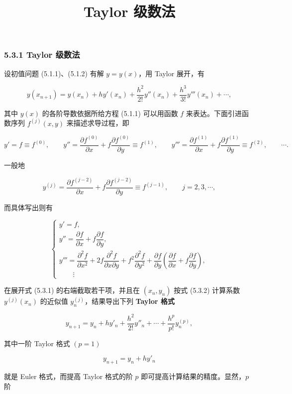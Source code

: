 \documentclass[
  10pt,
  fontset=fandol]{ctexart}
\title{Taylor 级数法}
\author{}
\date{}
\begin{document}
\maketitle

\subsubsection{5.3.1 Taylor 级数法}\label{taylor-ux7ea7ux6570ux6cd5}

设初值问题 (5.1.1)、(5.1.2) 有解 \(y=y(x)\)，用 Taylor 展开，有

\[
y(x_{n+1})=y(x_n)+hy'(x_n)+\frac{h^2}{2!}y''(x_n)+\frac{h^3}{3!}y'''(x_n)+\cdots,\tag{5.3.1}
\]

其中 \(y(x)\) 的各阶导数依据所给方程 (5.1.1) 可以用函数 \(f\) 来表达。下面引进函数序列 \(f^{(j)}(x,y)\) 来描述求导过程，即

\[
y'=f\equiv f^{(0)},\qquad
y''=\frac{\partial f^{(0)}}{\partial x}+f\frac{\partial f^{(0)}}{\partial y}\equiv f^{(1)},\qquad
y'''=\frac{\partial f^{(1)}}{\partial x}+f\frac{\partial f^{(1)}}{\partial y}\equiv f^{(2)},\qquad\cdots.
\]

一般地

\[
y^{(j)}=\frac{\partial f^{(j-2)}}{\partial x}+f\frac{\partial f^{(j-2)}}{\partial y}\equiv f^{(j-1)},\qquad j=2,3,\cdots,
\]

而具体写出则有

\[
\begin{cases}
y'=f,\\
y''=\dfrac{\partial f}{\partial x}+f\dfrac{\partial f}{\partial y},\\
y'''=\dfrac{\partial^2f}{\partial x^2}+2f\dfrac{\partial^2f}{\partial x\partial y}
+f^2\dfrac{\partial^2f}{\partial y^2}
+\dfrac{\partial f}{\partial y}\left(\dfrac{\partial f}{\partial x}+f\dfrac{\partial f}{\partial y}\right),\\
\qquad\vdots
\end{cases}\tag{5.3.2}
\]

在展开式 (5.3.1) 的右端截取若干项，并且在 \((x_n,y_n)\) 按式 (5.3.2) 计算系数 \(y^{(j)}(x_n)\) 的近似值 \(y_n^{(j)}\)，结果导出下列 \textbf{Taylor 格式}

\[
y_{n+1}=y_n+hy'_n+\frac{h^2}{2!}y''_n+\cdots+\frac{h^p}{p!}y_n^{(p)},\tag{5.3.3}
\]

其中一阶 Taylor 格式 \((p=1)\)

\[
y_{n+1}=y_n+hy'_n
\]

就是 Euler 格式，而提高 Taylor 格式的阶 \(p\) 即可提高计算结果的精度。显然，\(p\) 阶
\end{document}
